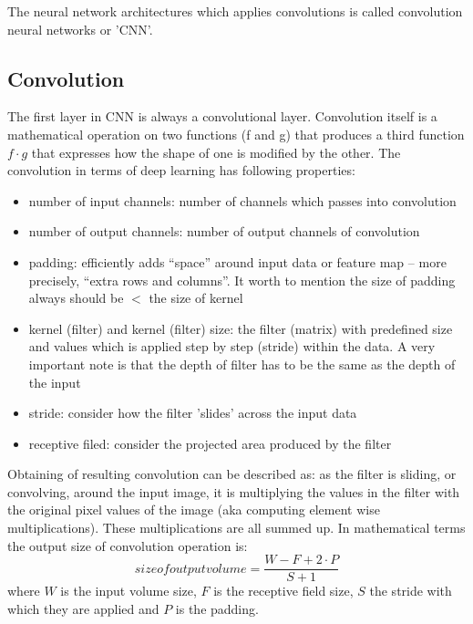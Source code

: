 The neural network architectures which applies convolutions is called convolution neural networks or 'CNN'.    

\subsection{Convolution}
The first layer in CNN is always a convolutional layer. Convolution itself is a mathematical operation on two functions (f and g) that produces a third function $f \cdot g$ that expresses how the shape of one is modified by the other. The convolution in terms of deep learning has following properties:  
\begin{itemize}
    \item number of input channels: number of channels which passes into convolution 
    \item number of output channels: number of output channels of convolution
    \item padding: efficiently adds “space” around input data or feature map – more precisely, “extra rows and columns”. It worth to mention the size of padding always should be $<$ the size of kernel 
    \item kernel (filter) and kernel (filter) size: the filter (matrix) with predefined size and values which is applied step by step (stride) within the data. A very important note is that the depth of filter has to be the same as the depth of the input
    \item stride: consider how the filter 'slides' across the input data
    \item receptive filed: consider the projected area produced by the filter
\end{itemize}

Obtaining of resulting convolution can be described as: as the filter is sliding, or convolving, around the input image, it is multiplying the values in the filter with the original pixel values of the image (aka computing element wise multiplications). These multiplications are all summed up. In mathematical terms the output size of convolution operation is: \[size of output volume = \frac{W-F+2 \cdot P}{S+1} \] where $W$ is the input volume size, $F$ is the receptive field size, $S$ the stride with which they are applied and $P$ is the padding.

